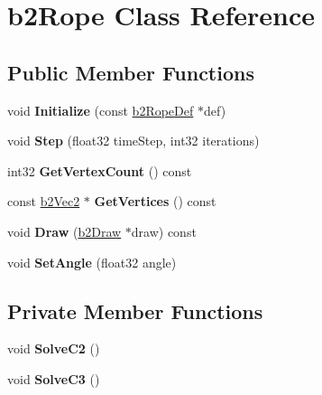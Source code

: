 \hypertarget{classb2_rope}{}\section{b2\+Rope Class Reference}
\label{classb2_rope}
\subsection*{Public Member Functions}
\begin{DoxyCompactItemize}
\item 
void {\bfseries Initialize} (const \hyperlink{structb2_rope_def}{b2\+Rope\+Def} $\ast$def)\hypertarget{classb2_rope_a2a672ca3310790f4af1beb123e597d70}{}\label{classb2_rope_a2a672ca3310790f4af1beb123e597d70}

\item 
void {\bfseries Step} (float32 time\+Step, int32 iterations)\hypertarget{classb2_rope_abe9ce398cef717b136645cbc37f38d70}{}\label{classb2_rope_abe9ce398cef717b136645cbc37f38d70}

\item 
int32 {\bfseries Get\+Vertex\+Count} () const \hypertarget{classb2_rope_aa002b5f7efd152770803aade884f2c75}{}\label{classb2_rope_aa002b5f7efd152770803aade884f2c75}

\item 
const \hyperlink{structb2_vec2}{b2\+Vec2} $\ast$ {\bfseries Get\+Vertices} () const \hypertarget{classb2_rope_a9f5c76a25e44baa702d2a6beef9f2f9c}{}\label{classb2_rope_a9f5c76a25e44baa702d2a6beef9f2f9c}

\item 
void {\bfseries Draw} (\hyperlink{classb2_draw}{b2\+Draw} $\ast$draw) const \hypertarget{classb2_rope_acefc7b4d53ba675fc08700f39d121ec3}{}\label{classb2_rope_acefc7b4d53ba675fc08700f39d121ec3}

\item 
void {\bfseries Set\+Angle} (float32 angle)\hypertarget{classb2_rope_a8a1717a5e0b2c54d56fe438c8cae43b7}{}\label{classb2_rope_a8a1717a5e0b2c54d56fe438c8cae43b7}

\end{DoxyCompactItemize}
\subsection*{Private Member Functions}
\begin{DoxyCompactItemize}
\item 
void {\bfseries Solve\+C2} ()\hypertarget{classb2_rope_abb803e414e406151c8c22ef814519b2a}{}\label{classb2_rope_abb803e414e406151c8c22ef814519b2a}

\item 
void {\bfseries Solve\+C3} ()\hypertarget{classb2_rope_ae18c19e30583e72e90ffb01674ba01ad}{}\label{classb2_rope_ae18c19e30583e72e90ffb01674ba01ad}

\end{DoxyCompactItemize}
